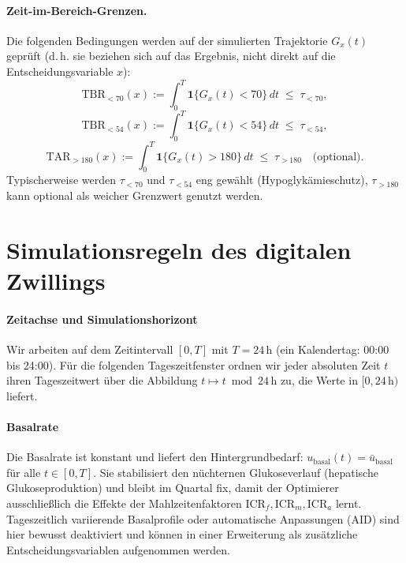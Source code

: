 \documentclass[ngerman,a4paper,12pt,pdftex]{article}
\newcommand{\Ind}{\mathbf{1}}
\newcommand{\ICR}{\mathrm{ICR}}
\begin{document}
\paragraph{Zeit-im-Bereich-Grenzen.} Die folgenden Bedingungen werden auf der simulierten Trajektorie \(G_x(t)\) geprüft (d.\,h. sie beziehen sich auf das Ergebnis, nicht direkt auf die Entscheidungsvariable \(x\)):
\[
\mathrm{TBR}_{<70}(x) := \int_0^T \Ind\{G_x(t)<70\}\,dt \;\le\; \tau_{<70},
\]
\[
\mathrm{TBR}_{<54}(x) := \int_0^T \Ind\{G_x(t)<54\}\,dt \;\le\; \tau_{<54},
\]
\[
\mathrm{TAR}_{>180}(x) := \int_0^T \Ind\{G_x(t)>180\}\,dt \;\le\; \tau_{>180}\quad \text{(optional)}.
\]
\noindent Typischerweise werden \(\tau_{<70}\) und \(\tau_{<54}\) eng gewählt (Hypoglykämieschutz), \(\tau_{>180}\) kann optional als weicher Grenzwert genutzt werden.

\section{Simulationsregeln des digitalen Zwillings}

\paragraph{Zeitachse und Simulationshorizont} Wir arbeiten auf dem Zeitintervall \([0,T]\) mit \(T=24\,\mathrm{h}\) (ein Kalendertag: 00{:}00 bis 24{:}00). Für die folgenden Tageszeitfenster ordnen wir jeder absoluten Zeit \(t\) ihren Tageszeitwert über die Abbildung \(t \mapsto t \bmod 24\,\mathrm{h}\) zu, die Werte in \([0,24\,\mathrm{h})\) liefert.
\medskip
\newcommand{\ubasal}{\bar u_{\mathrm{basal}}}
\paragraph{Basalrate}
Die Basalrate ist konstant und liefert den Hintergrundbedarf: $u_{\mathrm{basal}}(t)=\ubasal$ für alle $t\in[0,T]$. Sie stabilisiert den nüchternen Glukoseverlauf (hepatische Glukoseproduktion) und bleibt im Quartal fix, damit der Optimierer ausschließlich die Effekte der Mahlzeitenfaktoren $\ICR_f,\ICR_m,\ICR_a$ lernt. Tageszeitlich variierende Basalprofile oder automatische Anpassungen (AID) sind hier bewusst deaktiviert und können in einer Erweiterung als zusätzliche Entscheidungsvariablen aufgenommen werden.

\newcommand{\tod}{\mathrm{tod}}
\medskip
\end{document}
